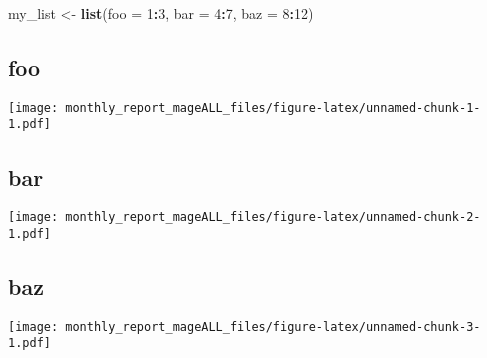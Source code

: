 \documentclass[a4paper,12pt]{article}
\newenvironment{Shaded}{\begin{snugshade}}{\end{snugshade}}
\newcommand{\KeywordTok}[1]{\textcolor[rgb]{0.13,0.29,0.53}{\textbf{#1}}}
\newcommand{\DataTypeTok}[1]{\textcolor[rgb]{0.13,0.29,0.53}{#1}}
\newcommand{\DecValTok}[1]{\textcolor[rgb]{0.00,0.00,0.81}{#1}}
\newcommand{\StringTok}[1]{\textcolor[rgb]{0.31,0.60,0.02}{#1}}
\newcommand{\OperatorTok}[1]{\textcolor[rgb]{0.81,0.36,0.00}{\textbf{#1}}}
\newcommand{\NormalTok}[1]{#1}
\begin{document}
\begin{Shaded}
\begin{Highlighting}[]
\NormalTok{my_list   <-}\StringTok{ }\KeywordTok{list}\NormalTok{(}\DataTypeTok{foo =} \DecValTok{1}\OperatorTok{:}\DecValTok{3}\NormalTok{, }\DataTypeTok{bar =} \DecValTok{4}\OperatorTok{:}\DecValTok{7}\NormalTok{, }\DataTypeTok{baz =} \DecValTok{8}\OperatorTok{:}\DecValTok{12}\NormalTok{)}
\end{Highlighting}
\end{Shaded}

\subsection{foo}\label{foo}

\texttt{[image: monthly\_report\_mageALL\_files/figure-latex/unnamed-chunk-1-1.pdf]}

\subsection{bar}\label{bar}

\texttt{[image: monthly\_report\_mageALL\_files/figure-latex/unnamed-chunk-2-1.pdf]}

\subsection{baz}\label{baz}

\texttt{[image: monthly\_report\_mageALL\_files/figure-latex/unnamed-chunk-3-1.pdf]}
\end{document}
